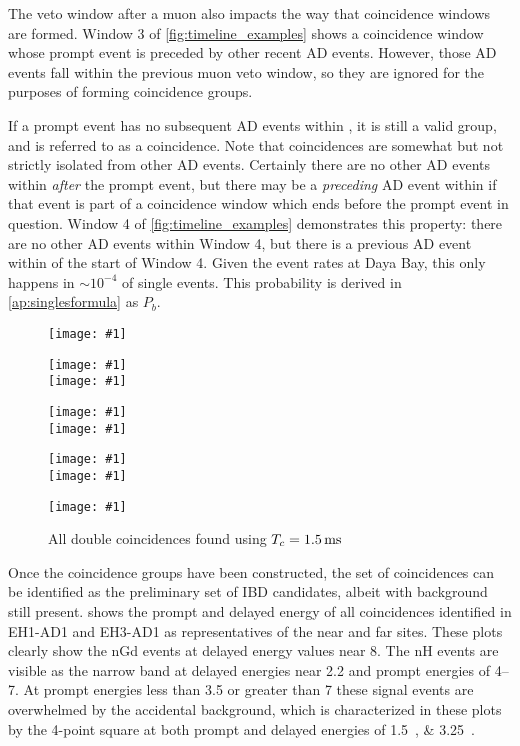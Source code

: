 The veto window after a muon also impacts the way that
coincidence windows are formed.
Window 3 of \cref{fig:timeline_examples} shows a coincidence window
whose prompt event is preceded by other recent AD events.
However, those AD events fall within the previous muon veto window,
so they are ignored for the purposes of forming coincidence groups.

If a prompt event has no subsequent AD events within \tc, it is
still a valid group, and is referred to as a  coincidence.
Note that  coincidences are somewhat but not strictly isolated
from other AD events.
Certainly there are no other AD events
within \tc{} \textit{after} the prompt event,
but there may be a \textit{preceding} AD event within \tc{}
if that event is part of a coincidence window
which ends before the prompt event in question.
Window 4 of \cref{fig:timeline_examples} demonstrates this property:
there are no other AD events within Window 4,
but there is a previous AD event within \tc{} of the start of Window 4.
Given the event rates at Daya Bay, this only happens in $\sim10^{-4}$
of single events.
This probability is derived in \cref{ap:singlesformula} as $P_b$.

\newcommand{\adheight}{0.23\textheight}
\newcommand{\adspacing}{1cm}
\newcommand{\adinclude}[1]{
    \texttt{[image: \#1]}
}
\newcommand{\adgrid}[3]{
    \begin{figure}
        \centering
        \adinclude{#3_EH1_AD1}
        \hspace{\adspacing}
        \adinclude{#3_EH1_AD2}\\
        \adinclude{#3_EH2_AD1}
        \hspace{\adspacing}
        \adinclude{#3_EH2_AD2}\\
        \adinclude{#3_EH3_AD1}
        \hspace{\adspacing}
        \adinclude{#3_EH3_AD2}\\
        \adinclude{#3_EH3_AD3}
        \hspace{\adspacing}
        \adinclude{#3_EH3_AD4}
        \caption{#1}
        \label{#2}
    \end{figure}
}

\adgrid{All double coincidences found using $T_c=\SI{1.5}{\milli\second}$}{fig:double_coinc_raw}{ch_event_selection/double_coincs}

Once the coincidence groups have been constructed,
the set of  coincidences can be identified as
the preliminary set of IBD candidates,
albeit with background still present.
 shows the prompt and delayed energy
of all  coincidences identified in EH1-AD1 and EH3-AD1
as representatives of the near and far sites.
These plots clearly show the nGd events
at delayed energy values near \SI{8}{\mev}.
The nH events are visible as the narrow band at
delayed energies near \SI{2.2}{\mev}
and prompt energies of \SIrange{4}{7}{\mev}.
At prompt energies less than \SI{3.5}{\mev} or greater than \SI{7}{\mev}
these signal events are overwhelmed by the accidental background,
which is characterized in these plots by the 4-point square at both prompt and
delayed energies of \SIlist{1.5;3.25}{\mev}.

